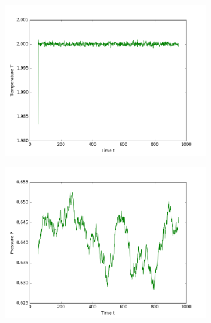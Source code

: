 \begin{figure}[ht]
\begin{subfigure}{0.3\textwidth}
\includegraphics[width=\textwidth]{fig/avTemperature_T2d0_M100.png}
\end{subfigure}
\hfill
\begin{subfigure}{0.3\textwidth}
\includegraphics[width=\textwidth]{fig/avPressure_T2d0_M100.png}
\end{subfigure}
\hfill
\begin{subfigure}{0.3\textwidth}

\end{subfigure}
\end{figure}
